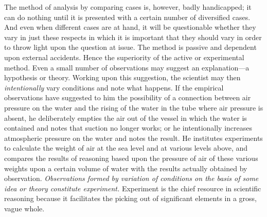 \documentclass[letterpaper]{book}
\begin{document}

The method of analysis by comparing cases is, however, badly
handicapped; it can do nothing until it is presented with a certain
number of diversified cases. And even when different cases are at hand,
it will be questionable whether they vary in just these respects in
which it is important that they should vary in order to throw light upon
the question at issue. The method is passive and dependent upon external
accidents. Hence the superiority of the active or experimental method.
Even a small number of observations may suggest an explanation---a
hypothesis or theory. Working upon this suggestion, the scientist may
then \emph{intentionally} vary conditions and note what happens. If the
empirical observations have suggested to him the possibility of a
connection between air pressure on the water and the rising of the water
in the tube where air pressure is absent, he deliberately empties the
air out of the vessel in which the water is contained and notes that
suction no longer works; or he intentionally increases atmospheric
pressure on the water and notes the result. He institutes experiments to
calculate the weight of air at the sea level and at various levels
above, and compares the results of reasoning based upon the pressure of
air
of these various weights upon a certain volume of water with the results
actually obtained by observation. \emph{Observations formed by variation
of conditions on the basis of some idea or theory constitute
experiment.} Experiment is the chief resource in scientific reasoning
because it facilitates the picking out of significant elements in a
gross, vague whole.

\end{document}
